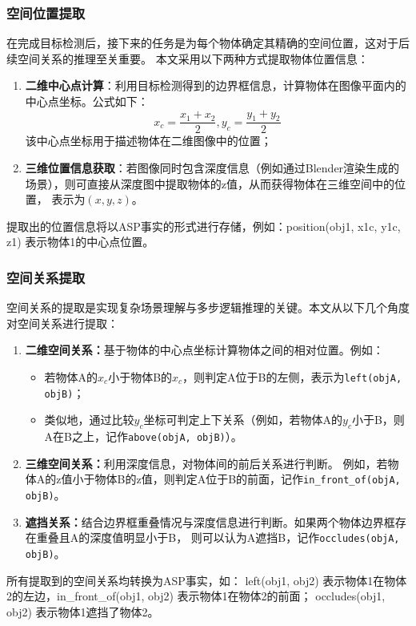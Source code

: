 \subsubsection{空间位置提取}
在完成目标检测后，接下来的任务是为每个物体确定其精确的空间位置，这对于后续空间关系的推理至关重要。
本文采用以下两种方式提取物体位置信息：
\begin{enumerate}
\item \textbf{二维中心点计算}：利用目标检测得到的边界框信息，计算物体在图像平面内的中心点坐标。公式如下：
$$x_c = \frac{x_1+x_2}{2}, y_c = \frac{y_1 + y_2}{2}$$
该中心点坐标用于描述物体在二维图像中的位置；
\item \textbf{三维位置信息获取}：若图像同时包含深度信息（例如通过Blender渲染生成的场景），则可直接从深度图中提取物体的z值，从而获得物体在三维空间中的位置，
表示为$(x, y, z)$。
\end{enumerate}

提取出的位置信息将以ASP事实的形式进行存储，例如：position(obj1, x1c, y1c, z1) 表示物体1的中心点位置。
\subsubsection{空间关系提取}
空间关系的提取是实现复杂场景理解与多步逻辑推理的关键。本文从以下几个角度对空间关系进行提取：
\begin{enumerate}[itemsep=0.5em] 
\item \textbf{二维空间关系：}基于物体的中心点坐标计算物体之间的相对位置。例如： 
    \begin{itemize}[leftmargin=2em] 
        \item 若物体A的$x_c$小于物体B的$x_c$，则判定A位于B的左侧，表示为\texttt{left(objA, objB)}； 
        \item 类似地，通过比较$y_c$坐标可判定上下关系（例如，若物体A的$y_c$小于B，则A在B之上，记作\texttt{above(objA, objB)}）。 
    \end{itemize} 
\item \textbf{三维空间关系：}利用深度信息，对物体间的前后关系进行判断。
例如，若物体A的z值小于物体B的z值，则判定A位于B的前面，记作\texttt{in\_front\_of(objA, objB)}。 
\item \textbf{遮挡关系：}结合边界框重叠情况与深度信息进行判断。如果两个物体边界框存在重叠且A的深度值明显小于B，
则可以认为A遮挡B，记作\texttt{occludes(objA, objB)}。 
\end{enumerate}
所有提取到的空间关系均转换为ASP事实，如：
left(obj1, obj2) 表示物体1在物体2的左边，in\_front\_of(obj1, obj2) 表示物体1在物体2的前面；
occludes(obj1, obj2) 表示物体1遮挡了物体2。
